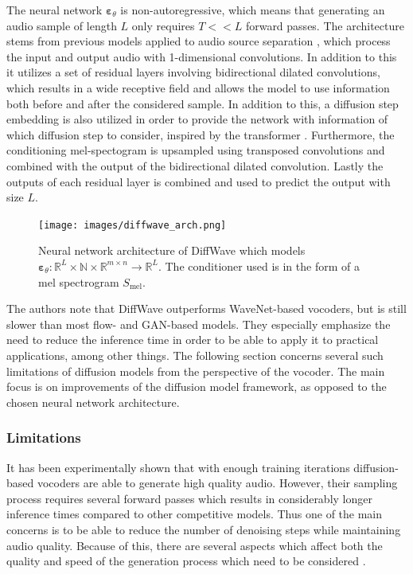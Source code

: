 \documentclass{article}
\begin{document}
The neural network $\bm{\varepsilon}_{\theta}$ is non-autoregressive, which means that generating an audio sample of length $L$ only requires $T << L$ forward passes. The architecture stems from previous models applied to audio source separation \cite{rethage2018wavenet}, which process the input and output audio with 1-dimensional convolutions. In addition to this it utilizes a set of residual layers involving bidirectional dilated convolutions, which results in a wide receptive field and allows the model to use information both before and after the considered sample. In addition to this, a diffusion step embedding is also utilized in order to provide the network with information of which diffusion step to consider, inspired by the transformer \cite{vaswani2017attention}. Furthermore, the conditioning mel-spectogram is upsampled using transposed convolutions and combined with the output of the bidirectional dilated convolution. Lastly the outputs of each residual layer is combined and used to predict the output with size $L$.

\begin{figure}[H]
    \centering
    \texttt{[image: images/diffwave\_arch.png]}
    \caption{\onehalfspacing Neural network architecture of DiffWave \cite{kong2020diffwave} which models $\bm{\varepsilon}_{\theta}: \mathbb{R}^L \times \mathbb{N} \times \mathbb{R}^{m\times n} \to \mathbb{R}^L$. The conditioner used is in the form of a mel spectrogram $S_{\text{mel}}$.}
    \label{fig:diffwavearch}
\end{figure}

The authors note that DiffWave outperforms WaveNet-based vocoders, but is still slower than most flow- and GAN-based models. They especially emphasize the need to reduce the inference time in order to be able to apply it to practical applications, among other things. The following section concerns several such limitations of diffusion models from the perspective of the vocoder. The main focus is on improvements of the diffusion model framework, as opposed to the chosen neural network architecture.

\subsubsection{Limitations}
It has been experimentally shown that with enough training iterations diffusion-based vocoders are able to generate high quality audio. However, their sampling process requires several forward passes which results in considerably longer inference times compared to other competitive models. Thus one of the main concerns is to be able to reduce the number of denoising steps while maintaining audio quality. Because of this, there are several aspects which affect both the quality and speed of the generation process which need to be considered \cite{albadawy2022vocbench}. 
\end{document}
